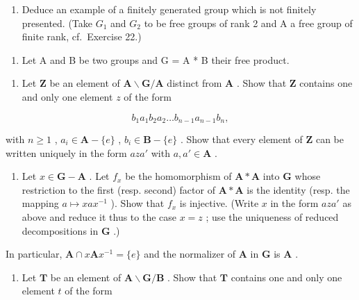 \begin{enumerate}
\def\labelenumi{(\alph{enumi})}
\setcounter{enumi}{2}
\tightlist
\item
  Deduce an example of a finitely generated group which is not finitely presented. (Take \(G_{1}\) and \(G_{2}\) to be free groups of rank 2 and A a free group of finite rank, cf.~Exercise 22.)
\end{enumerate}

\begin{enumerate}
\def\labelenumi{\arabic{enumi}.}
\setcounter{enumi}{29}
\tightlist
\item
  Let A and B be two groups and G = A * B their free product.
\end{enumerate}

\begin{enumerate}
\def\labelenumi{(\alph{enumi})}
\tightlist
\item
  Let \(\mathbf{Z}\) be an element of \(\mathbf{A} \backslash \mathbf{G} / \mathbf{A}\) distinct from \(\mathbf{A}\) . Show that \(\mathbf{Z}\) contains one and only one element \(z\) of the form
\end{enumerate}

\[
b _ {1} a _ {1} b _ {2} a _ {2} \dots b _ {n - 1} a _ {n - 1} b _ {n},
\]

with \(n \geqslant 1\) , \(a_i \in \mathbf{A} - \{e\}\) , \(b_i \in \mathbf{B} - \{e\}\) . Show that every element of \(\mathbf{Z}\) can be written uniquely in the form \(aza'\) with \(a, a' \in \mathbf{A}\) .

\begin{enumerate}
\def\labelenumi{(\alph{enumi})}
\setcounter{enumi}{1}
\tightlist
\item
  Let \(x \in \mathbf{G} - \mathbf{A}\) . Let \(f_x\) be the homomorphism of \(\mathbf{A} * \mathbf{A}\) into \(\mathbf{G}\) whose restriction to the first (resp. second) factor of \(\mathbf{A} * \mathbf{A}\) is the identity (resp. the mapping \(a \mapsto xax^{-1}\) ). Show that \(f_x\) is injective. (Write \(x\) in the form \(aza'\) as above and reduce it thus to the case \(x = z\) ; use the uniqueness of reduced decompositions in \(\mathbf{G}\) .)
\end{enumerate}

In particular, \(\mathbf{A} \cap x\mathbf{A}x^{-1} = \{e\}\) and the normalizer of \(\mathbf{A}\) in \(\mathbf{G}\) is \(\mathbf{A}\) .

\begin{enumerate}
\def\labelenumi{(\alph{enumi})}
\setcounter{enumi}{2}
\tightlist
\item
  Let \(\mathbf{T}\) be an element of \(\mathbf{A} \backslash \mathbf{G} / \mathbf{B}\) . Show that \(\mathbf{T}\) contains one and only one element \(t\) of the form
\end{enumerate}

